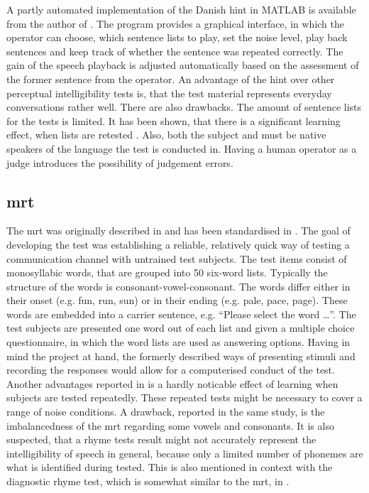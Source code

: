 A partly automated implementation of the Danish \gls{hint} in MATLAB\textsuperscript{\textregistered} is available from the author of \citep{hint_2011}. The program provides a graphical interface, in which the operator can choose, which sentence lists to play, set the noise level, play back sentences and keep track of whether the sentence was repeated correctly. The gain of the speech playback is adjusted automatically based on the assessment of the former sentence from the operator.
An advantage of the \gls{hint} over other perceptual intelligibility tests is, that the test material represents everyday conversations rather well.
There are also drawbacks. The amount of sentence lists for the tests is limited. It has been shown, that there is a significant learning effect, when lists are retested \citep[p. 205 f.]{hint_2011}.
Also, both the subject and must be native speakers of the language the test is conducted in. Having a human operator as a judge introduces the possibility of judgement errors.

\subsection{\gls{mrt}}\label{ssec:mrt}
The \gls{mrt} was originally described in \citep{mrt_63} and has been standardised in \citep{ansi_s3.2}. The goal of developing the test was establishing a reliable, relatively quick way of testing a communication channel with untrained test subjects.
The test items consist of monosyllabic words, that are grouped into 50 six-word lists. Typically the structure of the words is consonant-vowel-consonant. The words differ either in their onset (e.g. fun, run, sun) or in their ending (e.g. pale, pace, page). 
These words are embedded into a carrier sentence, e.g. \enquote{Please select the word \dots}. 
The test subjects are presented one word out of each list and given a multiple choice questionnaire, in which the word lists are used as answering options. 
Having in mind the project at hand, the formerly described ways of presenting stimuli and recording the responses would allow for a computerised conduct of the test.
Another advantages reported in \citep[p. 17]{arl_us_army} is a hardly noticable effect of learning when subjects are tested repeatedly. These repeated tests might be necessary to cover a range of noise conditions.
A drawback, reported in the same study, is the imbalancedness of the \gls{mrt} regarding some vowels and consonants. 
It is also suspected, that a rhyme tests result might not accurately represent the intelligibility of speech in general, because only a limited number of phonemes are what is identified during tested. This is also mentioned in context with the diagnostic rhyme test, which is somewhat similar to the \gls{mrt}, in \citep{greenspan_98}. 

